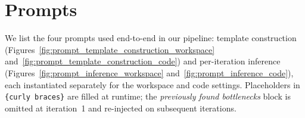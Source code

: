\clearpage
\appendix



\section{Prompts}
\label{appen:prompts}

We list the four prompts used end-to-end in our pipeline: template construction (Figures~\ref{fig:prompt_template_construction_workspace} and~\ref{fig:prompt_template_construction_code}) and per-iteration inference (Figures~\ref{fig:prompt_inference_workspace} and~\ref{fig:prompt_inference_code}), each instantiated separately for the workspace and code settings. Placeholders in \texttt{\{curly braces\}} are filled at runtime; the \emph{previously found bottlenecks} block is omitted at iteration~1 and re-injected on subsequent iterations.


\clearpage

\clearpage

\clearpage

\clearpage
